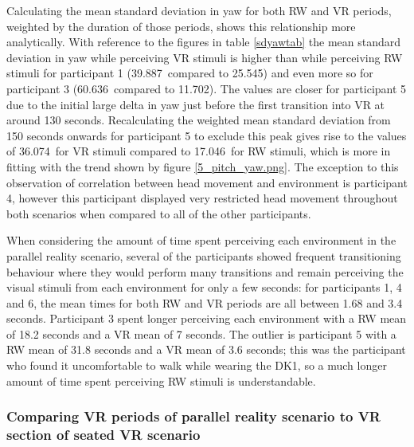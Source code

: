 \newpage

Calculating the mean standard deviation in yaw for both RW and VR periods, weighted by the duration of those periods, shows this relationship more analytically. With reference to the figures in table \ref{sdyawtab} the mean standard deviation in yaw while perceiving VR stimuli is higher than while perceiving RW stimuli for participant 1 (39.887\textdegree\ compared to 25.545\textdegree) and even more so for participant 3 (60.636\textdegree\ compared to 11.702\textdegree). The values are closer for participant 5 due to the initial large delta in yaw just before the first transition into VR at around 130 seconds. Recalculating the weighted mean standard deviation from 150 seconds onwards for participant 5 to exclude this peak gives rise to the values of 36.074\textdegree\ for VR stimuli compared to 17.046\textdegree\ for RW stimuli, which is more in fitting with the trend shown by figure \ref{5_pitch_yaw.png}. The exception to this observation of correlation between head movement and environment is participant 4, however this participant displayed very restricted head movement throughout both scenarios when compared to all of the other participants.

When considering the amount of time spent perceiving each environment in the parallel reality scenario, several of the participants showed frequent transitioning behaviour where they would perform many transitions and remain perceiving the visual stimuli from each environment for only a few seconds: for participants 1, 4 and 6, the mean times for both RW and VR periods are all between 1.68 and 3.4 seconds. Participant 3 spent longer perceiving each environment with a RW mean of 18.2 seconds and a VR mean of 7 seconds. The outlier is participant 5 with a RW mean of 31.8 seconds and a VR mean of 3.6 seconds; this was the participant who found it uncomfortable to walk while wearing the DK1, so a much longer amount of time spent perceiving RW stimuli is understandable.

\subsubsection{Comparing VR periods of parallel reality scenario to VR section of seated VR scenario}

